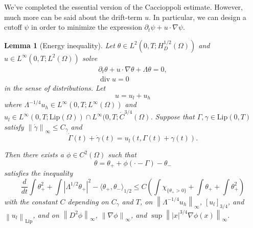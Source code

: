 \documentclass[11pt]{amsart}
\newtheorem{lemma}[theorem]{Lemma}
\theoremstyle{remark}
\theoremstyle{definition}
\newcommand{\chevron}[1]{\langle #1 \rangle}
\newcommand{\norm}[1]{\left\lVert#1\right\rVert}
\newcommand{\paren}[1]{\left( #1 \right)}
\newcommand{\bracket}[1]{\left[ #1 \right]}
\newcommand{\abs}[1]{\left\lvert #1 \right\rvert}
\newcommand{\del}{\partial}
\newcommand{\grad}{\nabla}
\newcommand{\ddt}{\frac{d}{dt}}
\renewcommand{\div}{\operatorname{div}}
\newcommand{\Lip}{\text{Lip}}
\newcommand{\indic}[1]{\chi_{\{#1\}}}
\newcommand{\ulow}{u_l}
\newcommand{\uhigh}{u_h}
\begin{document}
We've completed the essential version of the Caccioppoli estimate.  However, much more can be said about the drift-term $u$.  In particular, we can design a cutoff $\psi$ in order to minimize the expression $\del_t \psi + u\cdot\grad\psi$.  


\begin{lemma}[Energy inequality] \label{thm:energy inequality}
Let $\theta \in L^2(0,T; H_D^{1/2}(\Omega))$ and $u \in L^\infty(0,T; L^2(\Omega))$ solve
\begin{align*}
\del_t \theta + u\cdot \grad \theta + \Lambda \theta = 0,
\\ \div u = 0
\end{align*}
in the sense of distributions.  Let
\[ u = \ulow + \uhigh \]
where $\Lambda^{-1/4} \uhigh \in L^\infty(0,T; L^\infty(\Omega))$ and $\ulow \in L^\infty(0,T; \Lip(\Omega)) \cap L^\infty(0,T; \dot{C}^{3/4}(\Omega)$.  
Suppose that $\Gamma, \gamma \in \Lip(0,T)$ satisfy $\norm{\dot{\gamma}}_\infty \leq C_\gamma$ and
\[ \dot{\Gamma}(t) + \dot{\gamma}(t) = \ulow(t, \Gamma(t) + \gamma(t)). \]

Then there exists a $\phi \in C^2(\Omega)$ such that
\[ \theta = \theta_+ + \phi(\cdot-\Gamma) - \theta_- \]
satisfies the inequality
\[ \ddt \int \theta_+^2 + \int \abs{\Lambda^{1/2} \theta_+}^2 - \chevron{\theta_+,\theta_-}_{1/2} \leq C \paren{ \int \indic{\theta_+ > 0} + \int \theta_+ + \int \theta_+^2 } \]
with the constant $C$ depending on $C_\gamma$ and $T$, on $\norm{\Lambda^{-1/4} \uhigh}_\infty$, $\bracket{\ulow}_{3/4}$, and $\norm{\ulow}_\Lip$, and on $\norm{D^2 \phi}_\infty$, $\norm{\grad\phi}_\infty$, and $\sup \norm{|x|^{3/4} \grad\phi(x)}_\infty$.  
\end{lemma}
\end{document}
